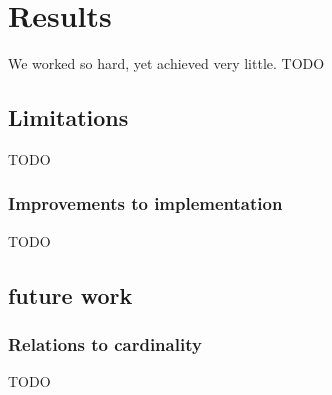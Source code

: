 \documentclass[12pt]{report}
\theoremstyle{definition}
\theoremstyle{theorem}
\begin{document}



\chapter{Results}\label{results}
We worked so hard, yet achieved very little. TODO

\section{Limitations}\label{limitations}

TODO

\subsection{Improvements to implementation}
TODO

\section{future work}
\subsection{Relations to cardinality}
TODO



\end{document}
